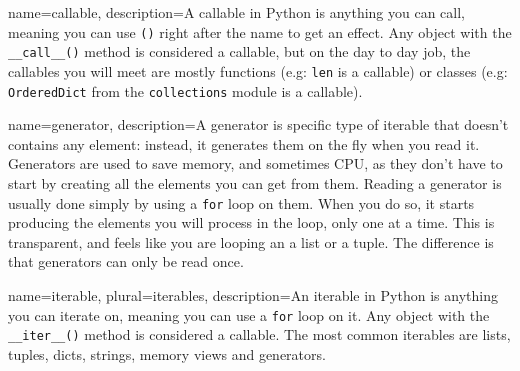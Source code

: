 \makeglossaries

{
    name=callable,
    description={A callable in Python is anything you can call, meaning you can use \lstinline{()} right after the name to get an effect. Any object with the \lstinline{__call__()} method is considered a callable, but on the day to day job, the callables you will meet are mostly functions (e.g: \lstinline{len} is a callable) or classes (e.g: \lstinline{OrderedDict} from the \lstinline{collections} module is a callable).}
}

{
    name=generator,
    description={A generator is specific type of \gls{iterable} that doesn't contains any element: instead, it generates them on the fly when you read it. Generators are used to save memory, and sometimes CPU, as they don't have to start by creating all the elements you can get from them. Reading a generator is usually done simply by using a \lstinline{for} loop on them. When you do so, it starts producing the elements you will process in the loop, only one at a time. This is transparent, and feels like you are looping an a list or a tuple. The difference is that generators can only be read once. }
}


{
    name=iterable,
    plural=iterables,
    description={An iterable in Python is anything you can iterate on, meaning you can use a \lstinline{for} loop on it. Any object with the \lstinline{__iter__()} method is considered a callable. The most common iterables are lists, tuples, dicts, strings, memory views and generators.}
}
